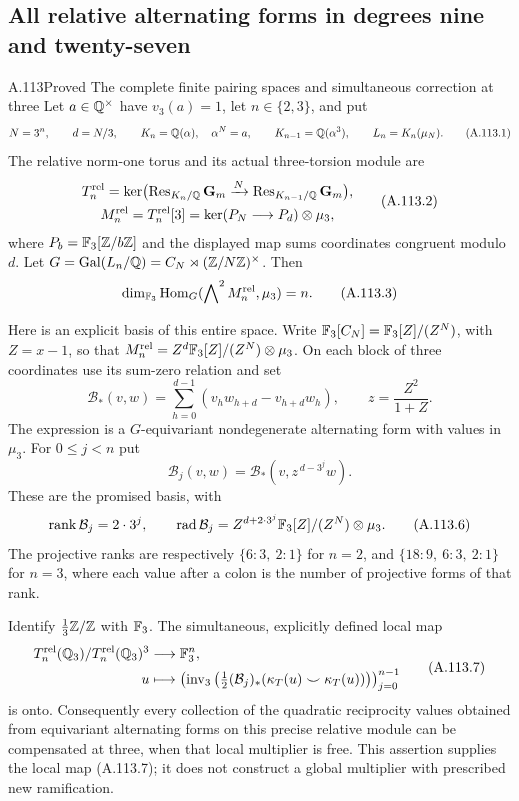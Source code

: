\subsection{All relative alternating forms in degrees nine and twenty-seven}

\begin{statement}{A.113}{Proved}
{The complete finite pairing spaces and simultaneous correction at three}
Let $a\in\mathbb Q^\times$ have $v_3(a)=1$, let $n\in\{2,3\}$,
and put
\[
 N=3^n,\qquad d=N/3,\qquad
 K_n=\mathbb Q(\alpha),\quad \alpha^N=a,\qquad
 K_{n-1}=\mathbb Q(\alpha^3),\qquad L_n=K_n(\mu_N).
 \tag{A.113.1}
\]
The relative norm-one torus and its actual three-torsion module are
\[
 \begin{gathered}
 T_n^{\rm rel}=\ker\bigl(\operatorname{Res}_{K_n/\mathbb Q}\mathbf G_m
       \xrightarrow{N}\operatorname{Res}_{K_{n-1}/\mathbb Q}\mathbf G_m\bigr),\\
 M_n^{\rm rel}=T_n^{\rm rel}[3]
       =\ker(P_N\longrightarrow P_d)\otimes\mu_3,
 \end{gathered}
 \tag{A.113.2}
\]
where $P_b=\mathbb F_3[\mathbb Z/b\mathbb Z]$ and the displayed map sums coordinates
congruent modulo $d$.
Let $G=\operatorname{Gal}(L_n/\mathbb Q)=C_N\rtimes(\mathbb Z/N\mathbb Z)^\times$.
Then
\[
 \dim_{\mathbb F_3}\operatorname{Hom}_G
       (\mathop{\bigwedge}\nolimits^2M_n^{\rm rel},\mu_3)=n.
 \tag{A.113.3}
\]

Here is an explicit basis of this entire space.
Write $\mathbb F_3[C_N]=\mathbb F_3[Z]/(Z^N)$, with $Z=x-1$, so that
$M_n^{\rm rel}=Z^d\mathbb F_3[Z]/(Z^N)\otimes\mu_3$.
On each block of three coordinates use its sum-zero relation and set
\[
 \mathcal B_*(v,w)=\sum_{h=0}^{d-1}
                 (v_hw_{h+d}-v_{h+d}w_h),
       \qquad z=\frac{Z^2}{1+Z}.
 \tag{A.113.4}
\]
The expression is a $G$-equivariant nondegenerate alternating form
with values in $\mu_3$.
For $0\le j<n$ put
\[
 \mathcal B_j(v,w)=\mathcal B_*(v,z^{\,d-3^j}w).
 \tag{A.113.5}
\]
These are the promised basis, with
\[
 \operatorname{rank}\mathcal B_j=2\cdot3^j,\qquad
 \operatorname{rad}\mathcal B_j
       =Z^{d+2\cdot3^j}\mathbb F_3[Z]/(Z^N)\otimes\mu_3.
 \tag{A.113.6}
\]
The projective ranks are respectively
$\{6:3,\ 2:1\}$ for $n=2$, and
$\{18:9,\ 6:3,\ 2:1\}$ for $n=3$, where each value after a
colon is the number of projective forms of that rank.

Identify $\tfrac13\mathbb Z/\mathbb Z$ with $\mathbb F_3$.
The simultaneous, explicitly defined local map
\[
 \begin{split}
 T_n^{\rm rel}(\mathbb Q_3)/T_n^{\rm rel}(\mathbb Q_3)^3
      &\longrightarrow\mathbb F_3^n,\\
 u&\longmapsto
 \left(\operatorname{inv}_3\left(
       \tfrac12(\mathcal B_j)_*
          (\kappa_T(u)\smile\kappa_T(u))\right)\right)_{j=0}^{n-1}
 \end{split}
 \tag{A.113.7}
\]
is onto.  Consequently every collection of the quadratic
reciprocity values obtained from equivariant alternating forms
on this precise relative module can be compensated at three,
when that local multiplier is free.
This assertion supplies the local map (A.113.7); it does not
construct a global multiplier with prescribed new ramification.
\end{statement}

